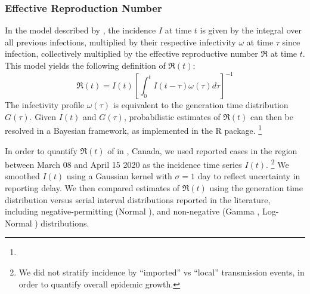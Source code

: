\subsubsection{Effective Reproduction Number}
In the model described by \textcite{Cori2013},
the incidence $I$ at time $t$ is given by
the integral over all previous infections,
multiplied by their respective infectivity $\omega$
at time $\tau$ since infection,
collectively multiplied by the effective reproductive number
$\Re$ at time $t$.
This model yields the following definition of $\Re(t)$:
\begin{equation}
\Re(t) = I(t) {\left[\int_{0}^{t}{I(t-\tau) \omega(\tau) d\tau}\right]}^{-1}
\end{equation}
The infectivity profile $\omega(\tau)$ is equivalent to
the generation time distribution $G(\tau)$.
Given $I(t)$ and $G(\tau)$,
probabilistic estimates of $\Re(t)$
can then be resolved in a Bayesian framework,
as implemented in the  R package.%
\footnote{}
\par
In order to quantify $\Re(t)$ of \covid in \gta, Canada,
we used reported cases in the region between March 08 and April 15 2020	%
as the incidence time series $I(t)$.%
\footnote{We did not stratify incidence by
  ``imported'' vs ``local'' transmission events,
  in order to quantify overall epidemic growth.}
We smoothed $I(t)$ using a Gaussian kernel with $\sigma = 1$ day
to reflect uncertainty in reporting delay.
We then compared estimates of $\Re(t)$ using
the \mle generation time distribution
versus serial interval distributions reported in the literature,
including negative-permitting (Normal \cite{Du2020}),
and non-negative (Gamma \cite{Zhang2020}, Log-Normal \cite{Nishiura2020})
distributions.